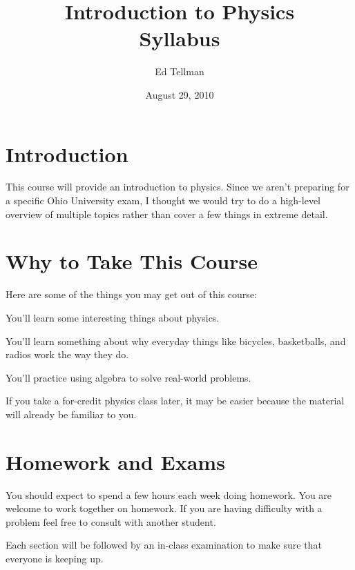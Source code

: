 \documentclass{article}
\title{Introduction to Physics \\ Syllabus}
\date{August 29, 2010}
\author{Ed Tellman}
\begin{document}
\maketitle

\section{Introduction}
This course will provide an introduction to physics.  Since we aren't preparing for a specific Ohio University exam, I
thought we would try to do a high-level overview of multiple topics rather than cover a few things in extreme detail.

\section{Why to Take This Course}

Here are some of the things you may get out of this course:
\begin{itemize*}
  \item You'll learn some interesting things about physics.
  \item You'll learn something about why everyday things like bicycles, basketballs, and radios work the way they do.
  \item You'll practice using algebra to solve real-world problems.
  \item If you take a for-credit physics class later, it may be easier because the material will already be familiar
    to you.
\end{itemize*}

\section{Homework and Exams}
You should expect to spend a few hours each week doing homework.  You are welcome to work together on homework.
If you are having difficulty with a problem feel free to consult with another student.


Each section will be followed by an in-class examination to make sure that everyone is keeping up.
\end{document}
